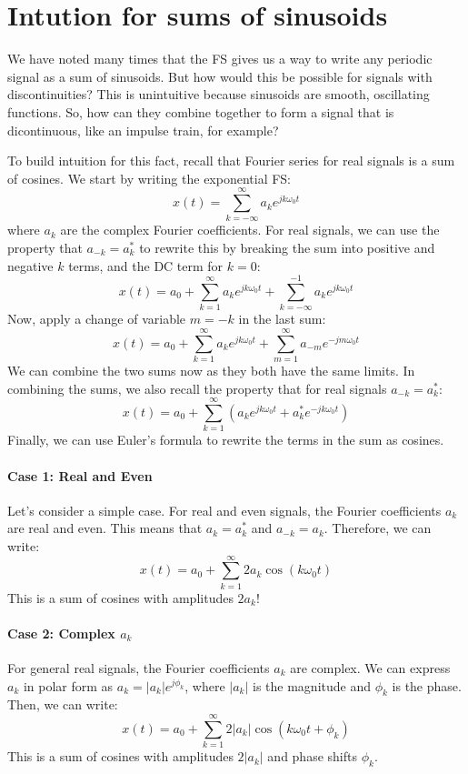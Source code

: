 \documentclass{ee102_notes}
\begin{document}
\section{Intution for sums of sinusoids}
We have noted many times that the FS gives us a way to write any periodic signal as a sum of sinusoids. But how would this be possible for signals with discontinuities? This is unintuitive because sinusoids are smooth, oscillating functions. So, how can they combine together to form a signal that is dicontinuous, like an impulse train, for example?

To build intuition for this fact, recall that Fourier series for real signals is a sum of cosines. We start by writing the exponential FS:
\[
x(t) = \sum_{k=-\infty}^{\infty} a_k e^{j k \omega_0 t}
\]
where \(a_k\) are the complex Fourier coefficients. For real signals, we can use the property that \(a_{-k} = a_k^*\) to rewrite this by breaking the sum into positive and negative \(k\) terms, and the DC term for \(k=0\):
\[
x(t) = a_0 + \sum_{k=1}^{\infty} a_k e^{j k \omega_0 t} + \sum_{k=-\infty}^{-1} a_k e^{j k \omega_0 t}
\]
Now, apply a change of variable \(m = -k\) in the last sum:
\[
x(t) = a_0 + \sum_{k=1}^{\infty} a_k e^{j k \omega_0 t} + \sum_{m=1}^{\infty} a_{-m} e^{-j m \omega_0 t}
\]
We can combine the two sums now as they both have the same limits. In combining the sums, we also recall the property that for real signals \(a_{-k} = a_k^*\):
\[
x(t) = a_0 + \sum_{k=1}^{\infty} \left( a_k e^{j k \omega_0 t} + a_k^* e^{-j k \omega_0 t} \right)
\]
Finally, we can use Euler's formula to rewrite the terms in the sum as cosines. 

\paragraph{Case 1: Real and Even}
Let's consider a simple case. For real and even signals, the Fourier coefficients \(a_k\) are real and even. This means that \(a_k = a_k^*\) and \(a_{-k} = a_k\). Therefore, we can write:
\[
x(t) = a_0 + \sum_{k=1}^{\infty} 2 a_k \cos(k \omega_0 t)
\]
This is a sum of cosines with amplitudes \(2 a_k\)! 

\paragraph{Case 2: Complex $a_k$}
For general real signals, the Fourier coefficients \(a_k\) are complex. We can express \(a_k\) in polar form as \(a_k = |a_k| e^{j \phi_k}\), where \(|a_k|\) is the magnitude and \(\phi_k\) is the phase. Then, we can write:
\[
x(t) = a_0 + \sum_{k=1}^{\infty} 2 |a_k| \cos(k \omega_0 t + \phi_k)
\]
This is a sum of cosines with amplitudes \(2 |a_k|\) and phase shifts \(\phi_k\).
\end{document}
